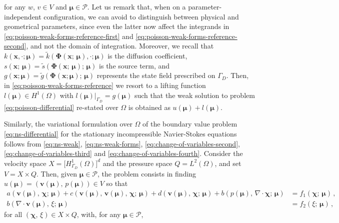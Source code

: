 \documentclass[12pt, a4paper, twoside, openright, notitlepage]{report}
\numberwithin{equation}{chapter}
\theoremstyle{theorem}
\theoremstyle{definition}
\theoremstyle{remark}
\theoremstyle{proposition}
\numberwithin{figure}{chapter}
\newcommand{\wt}[1]{\widetilde{#1}}
\newcommand{\bg}[1]{\boldsymbol{#1}}
\begin{document}
		for any $w$, $v \in V$ and $\bg{\mu} \in \mathcal{P}$. Let us remark that, when on a parameter-independent configuration, we can avoid to distinguish between physical and geometrical parameters, since even the latter now affect the integrands in \eqref{eq:poisson-weak-forms-reference-first} and \eqref{eq:poisson-weak-forms-reference-second}, and not the domain of integration. Moreover, we recall that $k(\bg{x}, \cdot; \bg{\mu}) = \wt{k}(\bg{\Phi}(\bg{x}; \, \bg{\mu}), \cdot; \bg{\mu})$ is the diffusion coefficient, $s(\bg{x}; \, \bg{\mu}) = \wt{s}(\bg{\Phi}(\bg{x}; \, \bg{\mu}); \, \bg{\mu})$ is the source term, and $g(\bg{x}; \bg{\mu}) = \wt{g}(\bg{\Phi}(\bg{x}; \bg{\mu}); \, \bg{\mu})$ represents the state field prescribed on $\Gamma_D$. Then, in \eqref{eq:poisson-weak-forms-reference} we resort to a lifting function $l(\bg{\mu}) \in H^1(\Omega)$ with $l(\bg{\mu}) \big\rvert_{\Gamma_D} = g(\bg{\mu})$ such that the weak solution to problem \eqref{eq:poisson-differential} re-stated over $\Omega$ is obtained as $u(\bg{\mu}) + l(\bg{\mu})$.
		
		Similarly, the variational formulation over $\Omega$ of the boundary value problem \eqref{eq:ns-differential} for the stationary incompressible Navier-Stokes equations follows from \eqref{eq:ns-weak}, \eqref{eq:ns-weak-forms}, \eqref{eq:change-of-variables-second}, \eqref{eq:change-of-variables-third} and \eqref{eq:change-of-variables-fourth}. Consider the velocity space $X = \big[ H_{\Gamma_D}^1(\Omega) \big]^d$ and the pressure space $Q = L^2(\Omega)$, and set $V = X \times Q$. Then, given $\bg{\mu} \in \mathcal{P}$, the problem consists in finding $u(\bg{\mu}) = (\bg{v}(\bg{\mu}), \, p(\bg{\mu})) \in V$ so that
		\begin{subequations}
			\label{eq:ns-weak-reference}
			\begin{align}
				a(\bg{v}(\bg{\mu}), \, \bg{\chi}; \, \bg{\mu}) + c(\bg{v}(\bg{\mu}), \, \bg{v}(\bg{\mu}), \, \bg{\chi}; \, \bg{\mu}) + d(\bg{v}(\bg{\mu}), \, \bg{\chi}; \, \bg{\mu}) + b(p(\bg{\mu}), \, \nabla \cdot \bg{\chi}; \, \bg{\mu}) & = f_1(\bg{\chi}; \, \bg{\mu}) \, , \\
				b(\nabla \cdot \bg{v}(\bg{\mu}), \, \xi; \, \bg{\mu}) & = f_2(\xi; \, \bg{\mu}) \, ,
			\end{align}
		\end{subequations}
		for all $(\bg{\chi}, \, \xi) \in X \times Q$, with, for any $\bg{\mu} \in \mathcal{P}$,	
					
\end{document}
